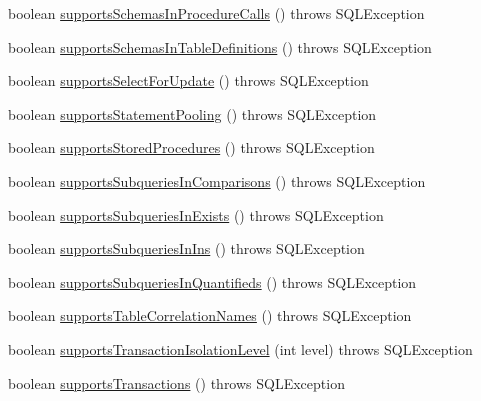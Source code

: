 \begin{DoxyCompactItemize}
\item 
boolean \mbox{\hyperlink{classcom_1_1mysql_1_1jdbc_1_1_database_meta_data_a02a6255ff051c5995931cbc5476074b1}{supports\+Schemas\+In\+Procedure\+Calls}} ()  throws S\+Q\+L\+Exception 
\item 
boolean \mbox{\hyperlink{classcom_1_1mysql_1_1jdbc_1_1_database_meta_data_ad5bd8e2c13979b970e438a08515ea559}{supports\+Schemas\+In\+Table\+Definitions}} ()  throws S\+Q\+L\+Exception 
\item 
boolean \mbox{\hyperlink{classcom_1_1mysql_1_1jdbc_1_1_database_meta_data_a5a137a927f36c066955df0d7880a0ea5}{supports\+Select\+For\+Update}} ()  throws S\+Q\+L\+Exception 
\item 
boolean \mbox{\hyperlink{classcom_1_1mysql_1_1jdbc_1_1_database_meta_data_a80657099e45ec05d48e94911bc6527d9}{supports\+Statement\+Pooling}} ()  throws S\+Q\+L\+Exception 
\item 
boolean \mbox{\hyperlink{classcom_1_1mysql_1_1jdbc_1_1_database_meta_data_ad177e70c15d38612e5aa008f7078bc33}{supports\+Stored\+Procedures}} ()  throws S\+Q\+L\+Exception 
\item 
boolean \mbox{\hyperlink{classcom_1_1mysql_1_1jdbc_1_1_database_meta_data_abc16823d166bde51aac59efa7ada257e}{supports\+Subqueries\+In\+Comparisons}} ()  throws S\+Q\+L\+Exception 
\item 
boolean \mbox{\hyperlink{classcom_1_1mysql_1_1jdbc_1_1_database_meta_data_a211baae4eb6447aa3a4c7b15190ebce4}{supports\+Subqueries\+In\+Exists}} ()  throws S\+Q\+L\+Exception 
\item 
boolean \mbox{\hyperlink{classcom_1_1mysql_1_1jdbc_1_1_database_meta_data_a66302a5e773430272b72475fadeb5060}{supports\+Subqueries\+In\+Ins}} ()  throws S\+Q\+L\+Exception 
\item 
boolean \mbox{\hyperlink{classcom_1_1mysql_1_1jdbc_1_1_database_meta_data_abd4be564ca2700088f26f0507032fc0e}{supports\+Subqueries\+In\+Quantifieds}} ()  throws S\+Q\+L\+Exception 
\item 
boolean \mbox{\hyperlink{classcom_1_1mysql_1_1jdbc_1_1_database_meta_data_a87fde389dbbcc0711d65bb3b7696dfef}{supports\+Table\+Correlation\+Names}} ()  throws S\+Q\+L\+Exception 
\item 
boolean \mbox{\hyperlink{classcom_1_1mysql_1_1jdbc_1_1_database_meta_data_abd5412a078a619ef1c47c73317af1d3b}{supports\+Transaction\+Isolation\+Level}} (int level)  throws S\+Q\+L\+Exception 
\item 
boolean \mbox{\hyperlink{classcom_1_1mysql_1_1jdbc_1_1_database_meta_data_a289cac917f19975c023dc68f8a7ae559}{supports\+Transactions}} ()  throws S\+Q\+L\+Exception 

\end{DoxyCompactItemize}
